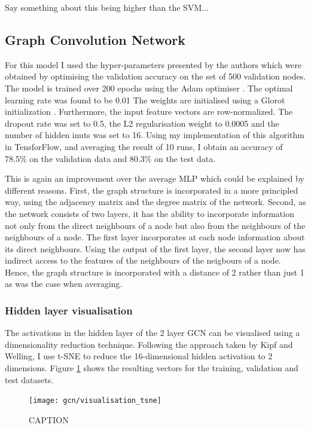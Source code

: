 \documentclass[12pt]{article}
\theoremstyle{definition}
\begin{document}
\bigskip

Say something about this being higher than the SVM...

\subsection{Graph Convolution Network}
For this model I used the hyper-parameters presented by the authors which were obtained by optimising the validation accuracy on the set of 500 validation nodes. The model is trained over 200 epochs using the Adam optimiser \cite{kingma2014adam}. The optimal learning rate was found to be 0.01 The weights are initialised using a Glorot initialization \cite{glorot2010understanding}. Furthermore, the input feature vectors are row-normalized. The dropout rate was set to 0.5, the L2 regularisation weight to 0.0005 and the number of hidden inuts was set to 16. Using my implementation of this algorithm in TensforFlow, and averaging the result of 10 runs, I obtain an accuracy of 78.5\% on the validation data and 80.3\% on the test data.

This is again an improvement over the average MLP which could be explained by different reasons. First, the graph structure is incorporated in a more principled way, using the adjacency matrix and the degree matrix of the network. Second, as the network consists of two layers, it has the ability to incorporate information not only from the direct neighbours of a node but also from the neighbours of the neighbours of a node. The first layer incorporates at each node information about its direct neighbours. Using the output of the first layer, the second layer now has indirect access to the features of the neighbours of the neigbours of a node. Hence, the graph structure is incorporated with a distance of 2 rather than just 1 as was the case when averaging.

\subsubsection{Hidden layer visualisation}
The activations in the hidden layer of the 2 layer GCN can be visualised using a dimensionality reduction technique. Following the approach taken by Kipf and Welling, I use t-SNE \cite{maaten2008visualizing} to reduce the 16-dimensional hidden activation to 2 dimensions. Figure \ref{fig/gcn_tsne} shows the resulting vectors for the training, validation and test datasets.
\begin{figure}[h]
	\texttt{[image: gcn/visualisation\_tsne]}
	\centering
	\caption{CAPTION}
	\label{fig/gcn_tsne}
\end{figure}
\end{document}
